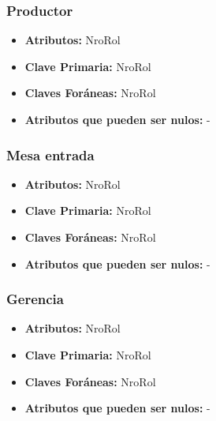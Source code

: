 \documentclass[a4paper,11pt]{article}
\begin{document}
\subsubsection{Productor}

\begin{itemize}

	\item \textbf{Atributos:} NroRol
	
	\item \textbf{Clave Primaria:} NroRol
	
	\item \textbf{Claves Foráneas:} NroRol
	
	\item \textbf{Atributos que pueden ser nulos:} -
	
\end{itemize}

\subsubsection{Mesa entrada}

\begin{itemize}

	\item \textbf{Atributos:} NroRol
	
	\item \textbf{Clave Primaria:} NroRol
	
	\item \textbf{Claves Foráneas:} NroRol
	
	\item \textbf{Atributos que pueden ser nulos:} -
	
\end{itemize}

\subsubsection{Gerencia}

\begin{itemize}

	\item \textbf{Atributos:} NroRol
	
	\item \textbf{Clave Primaria:} NroRol
	
	\item \textbf{Claves Foráneas:} NroRol
	
	\item \textbf{Atributos que pueden ser nulos:} -
	
\end{itemize}
\end{document}
